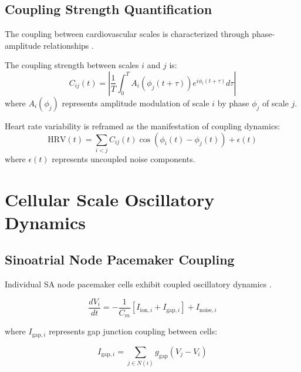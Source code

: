 \documentclass[twocolumn]{article}
\begin{document}
\subsection{Coupling Strength Quantification}

The coupling between cardiovascular scales is characterized through phase-amplitude relationships \citep{tort2010measuring}.

\begin{definition}
The coupling strength between scales $i$ and $j$ is:
\begin{equation}
C_{ij}(t) = \left|\frac{1}{T} \int_0^T A_i(\phi_j(t+\tau)) e^{i\phi_i(t+\tau)} d\tau\right|
\label{eq:cv_coupling}
\end{equation}
where $A_i(\phi_j)$ represents amplitude modulation of scale $i$ by phase $\phi_j$ of scale $j$.
\end{definition}

\begin{definition}
Heart rate variability is reframed as the manifestation of coupling dynamics:
\begin{equation}
\text{HRV}(t) = \sum_{i<j} C_{ij}(t) \cos(\phi_i(t) - \phi_j(t)) + \epsilon(t)
\label{eq:hrv_coupling}
\end{equation}
where $\epsilon(t)$ represents uncoupled noise components.
\end{definition}

\section{Cellular Scale Oscillatory Dynamics}

\subsection{Sinoatrial Node Pacemaker Coupling}

Individual SA node pacemaker cells exhibit coupled oscillatory dynamics \citep{maltsev2009synergism,lakatta2010paradigm}.

\begin{equation}
\frac{dV_i}{dt} = -\frac{1}{C_m}[I_{\text{ion},i} + I_{\text{gap},i}] + I_{\text{noise},i}
\label{eq:sa_voltage}
\end{equation}

where $I_{\text{gap},i}$ represents gap junction coupling between cells:

\begin{equation}
I_{\text{gap},i} = \sum_{j \in N(i)} g_{\text{gap}}(V_j - V_i)
\label{eq:gap_coupling}
\end{equation}
\end{document}
